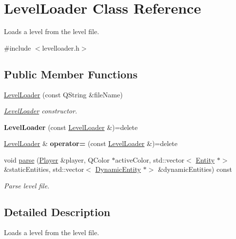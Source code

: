 \hypertarget{class_level_loader}{}\section{Level\+Loader Class Reference}
\label{class_level_loader}


Loads a level from the level file.  




{\ttfamily \#include $<$levelloader.\+h$>$}

\subsection*{Public Member Functions}
\begin{DoxyCompactItemize}
\item 
\hyperlink{class_level_loader_a9d60ff2b46a0dea2d4fc0859cb4e2f41}{Level\+Loader} (const Q\+String \&file\+Name)
\begin{DoxyCompactList}\small\item\em \hyperlink{class_level_loader}{Level\+Loader} constructor. \end{DoxyCompactList}\item 
\mbox{\label{class_level_loader_ad669d7334fbc2c05117237a30076ac8c}} 
{\bfseries Level\+Loader} (const \hyperlink{class_level_loader}{Level\+Loader} \&)=delete
\item 
\mbox{\label{class_level_loader_a64bc158c24f9f0e7138bb9c1e23977ce}} 
\hyperlink{class_level_loader}{Level\+Loader} \& {\bfseries operator=} (const \hyperlink{class_level_loader}{Level\+Loader} \&)=delete
\item 
void \hyperlink{class_level_loader_a9c372fd7727713be65ce519759717df2}{parse} (\hyperlink{class_player}{Player} \&player, Q\+Color $\ast$active\+Color, std\+::vector$<$ \hyperlink{class_entity}{Entity} $\ast$$>$ \&static\+Entities, std\+::vector$<$ \hyperlink{class_dynamic_entity}{Dynamic\+Entity} $\ast$$>$ \&dynamic\+Entities) const
\begin{DoxyCompactList}\small\item\em Parse level file. \end{DoxyCompactList}\end{DoxyCompactItemize}


\subsection{Detailed Description}
Loads a level from the level file. 

